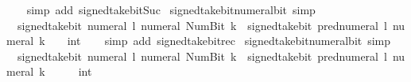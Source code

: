 \begin{isabellebody}
%
\isadelimproof
\ \ %
\endisadelimproof
%
\isatagproof
{}\isamarkupfalse%
\ {\isacharparenleft}{\kern0pt}simp\ add{\isacharcolon}{\kern0pt}\ signed{\isacharunderscore}{\kern0pt}take{\isacharunderscore}{\kern0pt}bit{\isacharunderscore}{\kern0pt}Suc{\isacharparenright}{\kern0pt}%
\endisatagproof
{\isafoldproof}%
%
\isadelimproof
\isanewline
%
\endisadelimproof
\isanewline
{}\isamarkupfalse%
\ signed{\isacharunderscore}{\kern0pt}take{\isacharunderscore}{\kern0pt}bit{\isacharunderscore}{\kern0pt}numeral{\isacharunderscore}{\kern0pt}bit{}\ {\isacharbrackleft}{\kern0pt}simp{\isacharbrackright}{\kern0pt}{\isacharcolon}{\kern0pt}\isanewline
\ \ {\isacartoucheopen}signed{\isacharunderscore}{\kern0pt}take{\isacharunderscore}{\kern0pt}bit\ {\isacharparenleft}{\kern0pt}numeral\ l{\isacharparenright}{\kern0pt}\ {\isacharparenleft}{\kern0pt}numeral\ {\isacharparenleft}{\kern0pt}Num{\isachardot}{\kern0pt}Bit{}\ k{\isacharparenright}{\kern0pt}{\isacharparenright}{\kern0pt}\ {\isacharequal}{\kern0pt}\ signed{\isacharunderscore}{\kern0pt}take{\isacharunderscore}{\kern0pt}bit\ {\isacharparenleft}{\kern0pt}pred{\isacharunderscore}{\kern0pt}numeral\ l{\isacharparenright}{\kern0pt}\ {\isacharparenleft}{\kern0pt}numeral\ k{\isacharparenright}{\kern0pt}\ {\isacharasterisk}{\kern0pt}\ {\isacharparenleft}{\kern0pt}{}\ {\isacharcolon}{\kern0pt}{\isacharcolon}{\kern0pt}\ int{\isacharparenright}{\kern0pt}{\isacartoucheclose}\isanewline
%
\isadelimproof
\ \ %
\endisadelimproof
%
\isatagproof
{}\isamarkupfalse%
\ {\isacharparenleft}{\kern0pt}simp\ add{\isacharcolon}{\kern0pt}\ signed{\isacharunderscore}{\kern0pt}take{\isacharunderscore}{\kern0pt}bit{\isacharunderscore}{\kern0pt}rec{\isacharparenright}{\kern0pt}%
\endisatagproof
{\isafoldproof}%
%
\isadelimproof
\isanewline
%
\endisadelimproof
\isanewline
{}\isamarkupfalse%
\ signed{\isacharunderscore}{\kern0pt}take{\isacharunderscore}{\kern0pt}bit{\isacharunderscore}{\kern0pt}numeral{\isacharunderscore}{\kern0pt}bit{}\ {\isacharbrackleft}{\kern0pt}simp{\isacharbrackright}{\kern0pt}{\isacharcolon}{\kern0pt}\isanewline
\ \ {\isacartoucheopen}signed{\isacharunderscore}{\kern0pt}take{\isacharunderscore}{\kern0pt}bit\ {\isacharparenleft}{\kern0pt}numeral\ l{\isacharparenright}{\kern0pt}\ {\isacharparenleft}{\kern0pt}numeral\ {\isacharparenleft}{\kern0pt}Num{\isachardot}{\kern0pt}Bit{}\ k{\isacharparenright}{\kern0pt}{\isacharparenright}{\kern0pt}\ {\isacharequal}{\kern0pt}\ signed{\isacharunderscore}{\kern0pt}take{\isacharunderscore}{\kern0pt}bit\ {\isacharparenleft}{\kern0pt}pred{\isacharunderscore}{\kern0pt}numeral\ l{\isacharparenright}{\kern0pt}\ {\isacharparenleft}{\kern0pt}numeral\ k{\isacharparenright}{\kern0pt}\ {\isacharasterisk}{\kern0pt}\ {}\ {\isacharplus}{\kern0pt}\ {\isacharparenleft}{\kern0pt}{}\ {\isacharcolon}{\kern0pt}{\isacharcolon}{\kern0pt}\ int{\isacharparenright}{\kern0pt}{\isacartoucheclose}\isanewline

\end{isabellebody}
